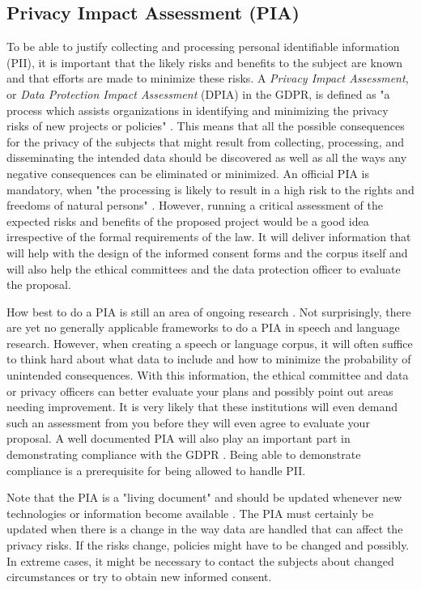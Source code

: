 \documentclass[10pt, a4paper]{article}
\begin{document}
\subsection{Privacy Impact Assessment (PIA)}

To be able to justify collecting and processing personal identifiable information (PII), it is important that the likely risks and benefits to the subject are known and that efforts are made to minimize these risks. A \emph{Privacy Impact Assessment}, or \emph{Data Protection Impact Assessment} (DPIA) in the GDPR, is defined as "a process which assists organizations in identifying and minimizing the privacy risks of new projects or policies" \cite{act2014conducting}. This means that all the possible consequences for the privacy of the subjects that might result from collecting, processing, and disseminating the intended data should be discovered as well as all the ways any negative consequences can be eliminated or minimized. An official PIA is mandatory, when "the processing is likely to result in a high risk to the rights and freedoms of natural persons" \cite{Art29DPWP}. However, running a critical assessment of the expected risks and benefits of the proposed project would be a good idea irrespective of the formal requirements of the law. It will deliver information that will help with the design of the informed consent forms and the corpus itself and will also help the ethical committees and the data protection officer to evaluate the proposal.

How best to do a PIA is still an area of ongoing research \cite{wagner2017privacy}. Not surprisingly, there are yet no generally applicable frameworks to do a PIA in speech and language research. However, when creating a speech or language corpus, it will often suffice to think hard about what data to include and how to minimize the probability of unintended consequences. With this information, the ethical committee and data or privacy officers can better evaluate your plans and possibly point out areas needing improvement. It is very likely that these institutions will even demand such an assessment from you before they will even agree to evaluate your proposal. A well documented PIA will also play an important part in demonstrating compliance with the GDPR \cite{Art29DPWP}. Being able to demonstrate compliance is a prerequisite for being allowed to handle PII.

Note that the PIA is a "living document" and should be updated whenever new technologies or information become available \cite{wagner2017privacy,wright2013comparative}. The PIA must certainly be updated when there is a change in the way data are handled that can affect the privacy risks. If the risks change, policies might have to be changed and possibly. In extreme cases, it might be necessary to contact the subjects about changed circumstances or try to obtain new informed consent.
\end{document}
